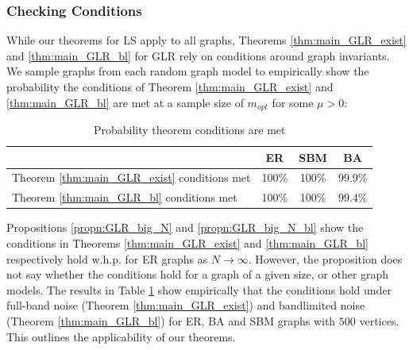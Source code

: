\subsubsection{Checking Conditions}
While our theorems for LS apply to all graphs, Theorems \ref{thm:main_GLR_exist} and \ref{thm:main_GLR_bl} for GLR rely on conditions around graph invariants. We sample graphs from each random graph model to empirically show the probability the conditions of Theorem \ref{thm:main_GLR_exist} and \ref{thm:main_GLR_bl} are met at a sample size of $m_{opt}$ for some $\mu > 0$:

\begin{table}[h!]
\caption{Probability theorem conditions are met}
    \begin{center}
        \begin{tabular}{lccc}
        \toprule
        & \textbf{ER} & \textbf{SBM} & \textbf{BA} \\ 
        \midrule
        Theorem \ref{thm:main_GLR_exist} conditions met & 100\% & 100\% & 99.9\% \\ 
        Theorem \ref{thm:main_GLR_bl} conditions met & 100\% & 100\% & 99.4\% \\
        \bottomrule
        \end{tabular}
    \end{center}
    \label{tbl:empirical_probabilities_conditions}
\end{table}

Propositions \ref{propn:GLR_big_N} and \ref{propn:GLR_big_N_bl} show the conditions in Theorems \ref{thm:main_GLR_exist} and \ref{thm:main_GLR_bl} respectively hold w.h.p. for ER graphs as $N \to \infty$. However, the proposition does not say whether the conditions hold for a graph of a given size, or other graph models. The results in Table \ref{tbl:empirical_probabilities_conditions} show empirically that the conditions hold under full-band noise (Theorem \ref{thm:main_GLR_exist}) and bandlimited noise (Theorem \ref{thm:main_GLR_bl}) for ER, BA and SBM graphs with $500$ vertices. This outlines the applicability of our theorems.

